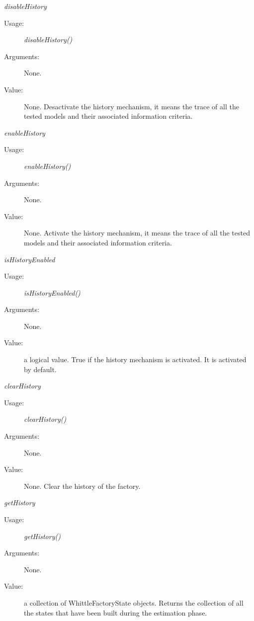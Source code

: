 \begin{description}
\begin{description}
\item \textit{disableHistory}
\begin{description}
\item[Usage:] \textit{disableHistory()}
\item[Arguments:] None.
\item[Value:] None. Desactivate the history mechanism, it means the trace of all the tested models and their associated information criteria.
\end{description}
\bigskip

\item \textit{enableHistory}
\begin{description}
\item[Usage:] \textit{enableHistory()}
\item[Arguments:] None.
\item[Value:] None. Activate the history mechanism, it means the trace of all the tested models and their associated information criteria.
\end{description}
\bigskip

\item \textit{isHistoryEnabled}
\begin{description}
\item[Usage:] \textit{isHistoryEnabled()}
\item[Arguments:] None.
\item[Value:] a logical value. True if the history mechanism is activated. It is activated by default.
\end{description}
\bigskip

\item \textit{clearHistory}
\begin{description}
\item[Usage:] \textit{clearHistory()}
\item[Arguments:] None.
\item[Value:] None. Clear the history of the factory.
\end{description}
\bigskip

\item \textit{getHistory}
\begin{description}
\item[Usage:] \textit{getHistory()}
\item[Arguments:] None.
\item[Value:] a collection of WhittleFactoryState objects. Returns the collection of all the states that have been built during the estimation phase.
\end{description}
\bigskip


\end{description}
\end{description}
